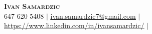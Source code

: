 \begin{center}
	\textbf{\Huge \scshape Ivan Samardzic} \\ \vspace{1pt}
	\small 647-620-5408 $|$
    \href{mailto:ivan.samardzic7@gmail.com}{\underline{ivan.samardzic7@gmail.com}} $|$
	\href{https://www.linkedin.com/in/ivansamardzic/}{\underline{https://www.linkedin.com/in/ivansamardzic/}} $|$
\end{center}
